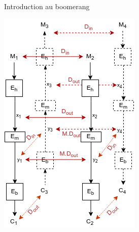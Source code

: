 \begin{frame}{Introduction au boomerang }
{\begin{center}
            \includegraphics[scale=0.5]{img/crypto/jafar/auto/boomerang-5.png}
        \end{center}
    }

\end{frame}